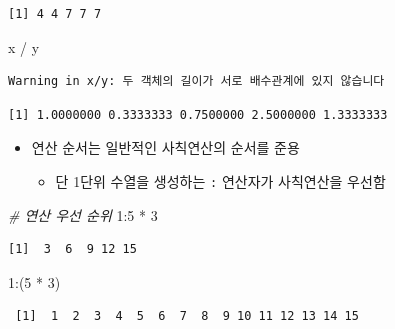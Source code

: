 \documentclass[
  11pt,
]{krantz}
\newenvironment{Shaded}{\begin{snugshade}}{\end{snugshade}}
\newcommand{\CommentTok}[1]{\textcolor[rgb]{0.37,0.37,0.37}{\textit{#1}}}
\newcommand{\DecValTok}[1]{\textcolor[rgb]{0.06,0.06,0.06}{#1}}
\newcommand{\NormalTok}[1]{#1}
\newcommand{\SpecialCharTok}[1]{\textcolor[rgb]{0,0,0}{#1}}
\providecommand{\tightlist}{%
  \setlength{\itemsep}{0pt}\setlength{\parskip}{0pt}}
\begin{document}
\begin{verbatim}
[1] 4 4 7 7 7
\end{verbatim}

\begin{Shaded}
\begin{Highlighting}[]
\NormalTok{x }\SpecialCharTok{/}\NormalTok{ y}
\end{Highlighting}
\end{Shaded}

\begin{verbatim}
Warning in x/y: 두 객체의 길이가 서로 배수관계에 있지 않습니다
\end{verbatim}

\begin{verbatim}
[1] 1.0000000 0.3333333 0.7500000 2.5000000 1.3333333
\end{verbatim}

\normalsize

\begin{itemize}
\tightlist
\item
  연산 순서는 일반적인 사칙연산의 순서를 준용

  \begin{itemize}
  \tightlist
  \item
    단 1단위 수열을 생성하는 \texttt{:} 연산자가 사칙연산을 우선함
  \end{itemize}
\end{itemize}

\footnotesize

\begin{Shaded}
\begin{Highlighting}[]
\CommentTok{\# 연산 우선 순위}
\DecValTok{1}\SpecialCharTok{:}\DecValTok{5} \SpecialCharTok{*} \DecValTok{3}
\end{Highlighting}
\end{Shaded}

\begin{verbatim}
[1]  3  6  9 12 15
\end{verbatim}

\begin{Shaded}
\begin{Highlighting}[]
\DecValTok{1}\SpecialCharTok{:}\NormalTok{(}\DecValTok{5} \SpecialCharTok{*} \DecValTok{3}\NormalTok{)}
\end{Highlighting}
\end{Shaded}

\begin{verbatim}
 [1]  1  2  3  4  5  6  7  8  9 10 11 12 13 14 15
\end{verbatim}
\end{document}
